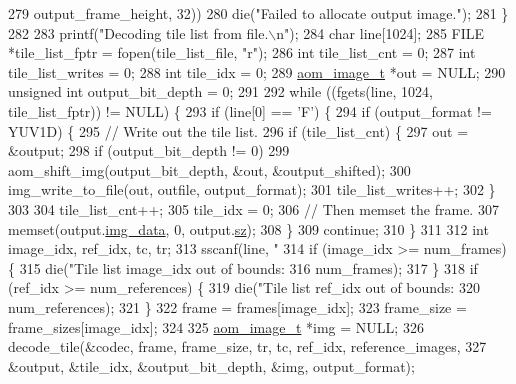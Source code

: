 \begin{DoxyCodeInclude}
{{{{{{{279                        output\_frame\_height, 32))
280       die(\textcolor{stringliteral}{"Failed to allocate output image."});
281   \}
282 
283   printf(\textcolor{stringliteral}{"Decoding tile list from file.\(\backslash\)n"});
284   \textcolor{keywordtype}{char} line[1024];
285   FILE *tile\_list\_fptr = fopen(tile\_list\_file, \textcolor{stringliteral}{"r"});
286   \textcolor{keywordtype}{int} tile\_list\_cnt = 0;
287   \textcolor{keywordtype}{int} tile\_list\_writes = 0;
288   \textcolor{keywordtype}{int} tile\_idx = 0;
289   \hyperlink{structaom__image}{aom\_image\_t} *out = NULL;
290   \textcolor{keywordtype}{unsigned} \textcolor{keywordtype}{int} output\_bit\_depth = 0;
291 
292   \textcolor{keywordflow}{while} ((fgets(line, 1024, tile\_list\_fptr)) != NULL) \{
293     \textcolor{keywordflow}{if} (line[0] == \textcolor{charliteral}{'F'}) \{
294       \textcolor{keywordflow}{if} (output\_format != YUV1D) \{
295         \textcolor{comment}{// Write out the tile list.}
296         \textcolor{keywordflow}{if} (tile\_list\_cnt) \{
297           out = &output;
298           \textcolor{keywordflow}{if} (output\_bit\_depth != 0)
299             aom\_shift\_img(output\_bit\_depth, &out, &output\_shifted);
300           img\_write\_to\_file(out, outfile, output\_format);
301           tile\_list\_writes++;
302         \}
303 
304         tile\_list\_cnt++;
305         tile\_idx = 0;
306         \textcolor{comment}{// Then memset the frame.}
307         memset(output.\hyperlink{structaom__image_a7c367f3227d5876ce9e5c198a01c2028}{img\_data}, 0, output.\hyperlink{structaom__image_af0f6c220bf000d1c488075c19d889290}{sz});
308       \}
309       \textcolor{keywordflow}{continue};
310     \}
311 
312     \textcolor{keywordtype}{int} image\_idx, ref\_idx, tc, tr;
313     sscanf(line, \textcolor{stringliteral}{"%
314     \textcolor{keywordflow}{if} (image\_idx >= num\_frames) \{
315       die(\textcolor{stringliteral}{"Tile list image\_idx out of bounds: %
316           num\_frames);
317     \}
318     \textcolor{keywordflow}{if} (ref\_idx >= num\_references) \{
319       die(\textcolor{stringliteral}{"Tile list ref\_idx out of bounds: %
320           num\_references);
321     \}
322     frame = frames[image\_idx];
323     frame\_size = frame\_sizes[image\_idx];
324 
325     \hyperlink{structaom__image}{aom\_image\_t} *img = NULL;
326     decode\_tile(&codec, frame, frame\_size, tr, tc, ref\_idx, reference\_images,
327                 &output, &tile\_idx, &output\_bit\_depth, &img, output\_format);
}}}}}}}}}}
\end{DoxyCodeInclude}
